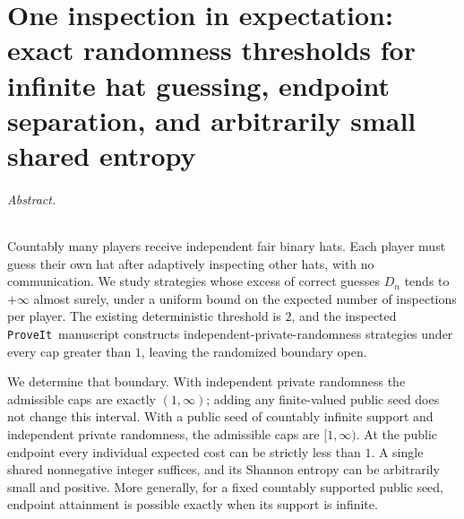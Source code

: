 \documentclass[11pt,letterpaper]{article}
\theoremstyle{definition}
\newcommand{\repo}{\texttt{ProveIt}}
\begin{document}
\part{One inspection in expectation: exact randomness thresholds for infinite hat guessing, endpoint separation, and arbitrarily small shared entropy}
\label{mbg:rnd:part}

\setcounter{section}{69}
\renewcommand{\thesection}{\arabic{section}}
\renewcommand{\theHsection}{rnd.\arabic{section}}
\makeatletter\gdef\Hy@chapapp{\Hy@chapterstring}\makeatother


\paragraph{Abstract.}
Countably many players receive independent fair binary hats. Each player
must guess their own hat after adaptively inspecting other hats, with no
communication. We study strategies whose excess of correct guesses
$D_n$ tends to $+\infty$ almost surely, under a uniform bound on the
expected number of inspections per player. The existing deterministic
threshold is $2$, and the inspected \repo\ manuscript constructs
independent-private-randomness strategies under every cap greater than
$1$, leaving the randomized boundary open.

We determine that boundary. With independent private randomness the
admissible caps are exactly $(1,\infty)$; adding any finite-valued public
seed does not change this interval. With a public seed of countably
infinite support and independent private randomness, the admissible caps are
$[1,\infty)$. At the public endpoint every individual expected cost can
be strictly less than $1$. A single shared nonnegative integer suffices,
and its Shannon entropy can be arbitrarily small and positive. More
generally, for a fixed countably supported public seed, endpoint
attainment is possible exactly when its support is infinite.
\end{document}
